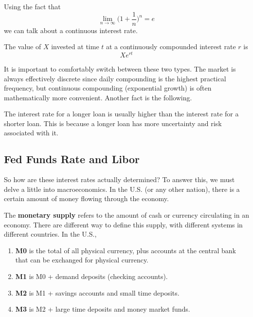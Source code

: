 \documentclass{article}
\begin{document}
    Using the fact that 
    \begin{equation}
      \lim_{n \rightarrow \infty} \bigg( 1 + \frac{1}{n}\bigg)^n = e
    \end{equation}
    we can talk about a continuous interest rate. 

    \begin{definition}
      The value of $X$ invested at time $t$ at a continuously compounded interest rate $r$ is 
      \begin{equation}
        X e^{rt}
      \end{equation}
    \end{definition}

    It is important to comfortably switch between these two types. The market is always effectively discrete since daily compounding is the highest practical frequency, but continuous compounding (exponential growth) is often mathematically more convenient. Another fact is the following. 

    \begin{lemma}
      The interest rate for a longer loan is usually higher than the interest rate for a shorter loan. This is because a longer loan has more uncertainty and risk associated with it.
    \end{lemma}

  \subsection{Fed Funds Rate and Libor}

    So how are these interest rates actually determined? To answer this, we must delve a little into macroeconomics. In the U.S. (or any other nation), there is a certain amount of money flowing through the economy. 

    \begin{definition}
      The \textbf{monetary supply} refers to the amount of cash or currency circulating in an economy. There are different way to define this supply, with different systems in different countries. In the U.S.,  
      \begin{enumerate}
        \item \textbf{M0} is the total of all physical currency, plus accounts at the central bank that can be exchanged for physical currency. 
        \item \textbf{M1} is M0 + demand deposits (checking accounts). 
        \item \textbf{M2} is M1 + savings accounts and small time deposits. 
        \item \textbf{M3} is M2 + large time deposits and money market funds.
      \end{enumerate}
    \end{definition}
\end{document}
